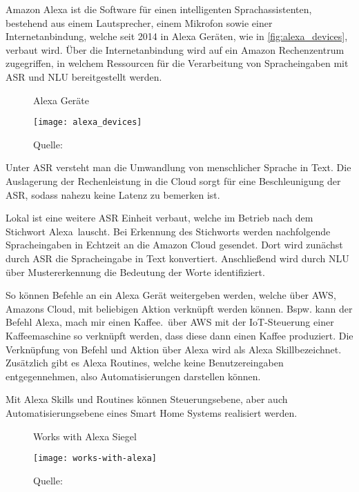 Amazon Alexa ist die Software für einen intelligenten Sprachassistenten, bestehend aus einem Lautsprecher, einem Mikrofon sowie einer Internetanbindung, welche seit 2014 in Alexa Geräten, wie in \autoref{fig:alexa_devices}, verbaut wird.
Über die Internetanbindung wird auf ein Amazon Rechenzentrum zugegriffen, in welchem Ressourcen für die Verarbeitung von Spracheingaben mit \ac{ASR} und \ac{NLU} bereitgestellt werden.

\begin{figure}[ht]
	\centering
	\caption{Alexa Geräte}
	\texttt{[image: alexa\_devices]}
	\caption*{\footnotesize{Quelle: }}
	\label{fig:alexa_devices}
\end{figure}

Unter \ac{ASR} versteht man die Umwandlung von menschlicher Sprache in Text.
Die Auslagerung der Rechenleistung in die Cloud sorgt für eine Beschleunigung der \ac{ASR}, sodass nahezu keine Latenz zu bemerken ist.

Lokal ist eine weitere \ac{ASR} Einheit verbaut, welche im Betrieb nach dem Stichwort \glqq Alexa\grqq \ lauscht.
Bei Erkennung des Stichworts werden nachfolgende Spracheingaben in Echtzeit an die Amazon Cloud gesendet.
Dort wird zunächst durch \ac{ASR} die Spracheingabe in Text konvertiert.
Anschließend wird durch \ac{NLU} über Mustererkennung die Bedeutung der Worte identifiziert. 

So können Befehle an ein Alexa Gerät weitergeben werden, welche über \ac{AWS}, Amazons Cloud, mit beliebigen Aktion verknüpft werden können.
Bspw. kann der Befehl \glqq Alexa, mach mir einen Kaffee.\grqq \ über \ac{AWS} mit der \ac{IoT}-Steuerung einer Kaffeemaschine so verknüpft werden, dass diese dann einen Kaffee produziert.
Die Verknüpfung von Befehl und Aktion über Alexa wird als \glqq Alexa Skill\grqq bezeichnet.
Zusätzlich gibt es \glqq Alexa Routines\grqq, welche keine Benutzereingaben entgegennehmen, also Automatisierungen darstellen können.

Mit Alexa Skills und Routines können Steuerungsebene, aber auch Automatisierungsebene eines Smart Home Systems realisiert werden.

\begin{wrapfigure}{r}{0.35\textwidth}
	\centering
	\caption{Works with Alexa Siegel}
	\texttt{[image: works-with-alexa]}
	\caption*{\footnotesize{Quelle: }}
	\label{fig:works_with_alexa}
\end{wrapfigure}

